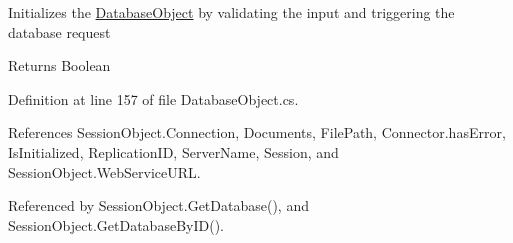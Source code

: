 Initializes the \mbox{\hyperlink{class_database_object}{Database\+Object}} by validating the input and triggering the database request 

\begin{DoxyReturn}{Returns}
Boolean
\end{DoxyReturn}


Definition at line 157 of file Database\+Object.\+cs.



References Session\+Object.\+Connection, Documents, File\+Path, Connector.\+has\+Error, Is\+Initialized, Replication\+ID, Server\+Name, Session, and Session\+Object.\+Web\+Service\+U\+RL.



Referenced by Session\+Object.\+Get\+Database(), and Session\+Object.\+Get\+Database\+By\+I\+D().


